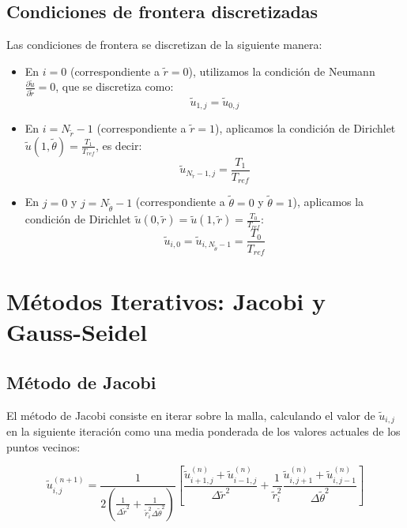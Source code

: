 \subsection{Condiciones de frontera discretizadas}

Las condiciones de frontera se discretizan de la siguiente manera:

\begin{itemize}
    \item En \(i = 0\) (correspondiente a \(\tilde{r} = 0\)), utilizamos la condición de Neumann \( \frac{\partial \tilde{u}}{\partial \tilde{r}} = 0 \), que se discretiza como:
    \[
    \tilde{u}_{1,j} = \tilde{u}_{0,j}
    \]
    \item En \(i = N_{\tilde{r}} - 1\) (correspondiente a \(\tilde{r} = 1\)), aplicamos la condición de Dirichlet \( \tilde{u}(1, \tilde{\theta}) = \frac{T_1}{T_{ref}} \), es decir:
    \[
    \tilde{u}_{N_{\tilde{r}}-1,j} = \frac{T_1}{T_{ref}}
    \]
    \item En \(j = 0\) y \(j = N_{\tilde{\theta}} - 1\) (correspondiente a \(\tilde{\theta} = 0\) y \(\tilde{\theta} = 1\)), aplicamos la condición de Dirichlet \( \tilde{u}(0, \tilde{r}) = \tilde{u}(1, \tilde{r}) = \frac{T_0}{T_{ref}} \):
    \[
    \tilde{u}_{i,0} = \tilde{u}_{i,N_{\tilde{\theta}}-1} = \frac{T_0}{T_{ref}}
    \]
\end{itemize}


\section{Métodos Iterativos: Jacobi y Gauss-Seidel}

\subsection{Método de Jacobi}

El método de Jacobi consiste en iterar sobre la malla, calculando el valor de \( \tilde{u}_{i,j} \) en la siguiente iteración como una media ponderada de los valores actuales de los puntos vecinos:

\begin{equation}
    \tilde{u}_{i,j}^{(n+1)} = \frac{1}{2 \left(\frac{1}{\Delta \tilde{r}^2} + \frac{1}{\tilde{r}_i^2 \Delta \tilde{\theta}^2}\right)} 
    \left[ \frac{\tilde{u}_{i+1,j}^{(n)} + \tilde{u}_{i-1,j}^{(n)}}{\Delta \tilde{r}^2} 
    + \frac{1}{\tilde{r}_i^2} \frac{\tilde{u}_{i,j+1}^{(n)} + \tilde{u}_{i,j-1}^{(n)}}{\Delta \tilde{\theta}^2} \right]
\end{equation}

